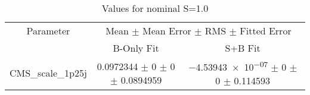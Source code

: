 \begin{table}
\centering
\caption{Values for nominal S=1.0}
\begin{tabular}{ccc}
\toprule
Parameter & \multicolumn{2}{c}{Mean $\pm$ Mean Error $\pm$ RMS $\pm$ Fitted Error}\\
 & B-Only Fit & S+B Fit\\
\midrule
CMS\_scale\_1p25j & \num{0.0972344} $\pm$ \num{0} $\pm$ \num{0} $\pm$ \num{0.0894959} & \num{-4.53943e-07} $\pm$ \num{0} $\pm$ \num{0} $\pm$ \num{0.114593}\\
\bottomrule
\end{tabular}
\end{table}